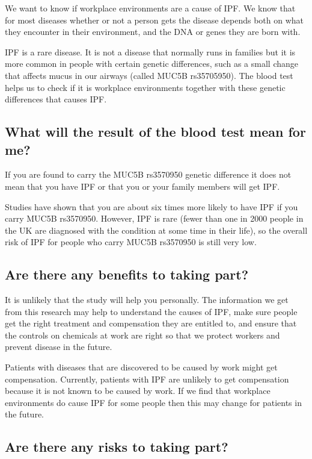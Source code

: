\documentclass[a4paper,10pt]{article}
\begin{document}
We want to know if workplace environments are a cause of IPF. We know that for most diseases whether or not a person gets the disease depends both on what they encounter in their environment, and the DNA or genes they are born with.

IPF is a rare disease. It is not a disease that normally runs in families but it is more common in people with certain genetic differences, such as a small change that affects mucus in our airways (called MUC5B rs35705950). The blood test helps us to check if it is workplace environments together with these genetic differences that causes IPF.   

\subsection*{What will the result of the blood test mean for me?}

If you are found to carry the MUC5B rs3570950 genetic difference it does not mean that you have IPF or that you or your family members will get IPF. 

Studies have shown that you are about six times more likely to have IPF if you carry MUC5B rs3570950. However, IPF is rare (fewer than one in 2000 people in the UK are diagnosed with the condition at some time in their life), so the overall risk of IPF for people who carry MUC5B rs3570950 is still very low.    

\subsection*{Are there any benefits to taking part?}

It is unlikely that the study will help you personally. The information we get from this research may help to understand the causes of IPF, make sure people get the right treatment and compensation they are entitled to, and ensure that the controls on chemicals at work are right so that we protect workers and prevent disease in the future.

Patients with diseases that are discovered to be caused by work might get compensation. Currently, patients with IPF are unlikely to get compensation because it is not known to be caused by work. If we find that workplace environments do cause IPF for some people then this may change for patients in the future.   

\subsection*{Are there any risks to taking part?}
\end{document}
